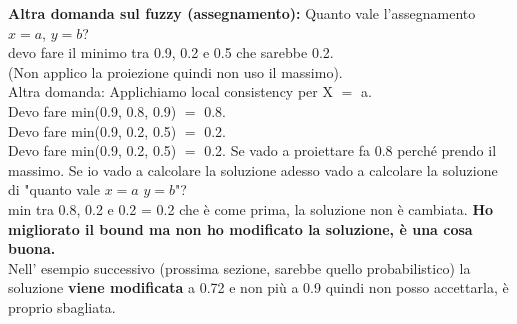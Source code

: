 \textbf{Altra domanda sul fuzzy (assegnamento): } Quanto vale l'assegnamento
$x=a$, $y=b$? \\devo fare il minimo tra 0.9, 0.2 e 0.5 che sarebbe 0.2. \\(Non
applico la proiezione quindi non uso il massimo). \\Altra domanda: Applichiamo
local consistency per X $=$ a. \\Devo fare min(0.9, 0.8, 0.9) $=$ 0.8. \\Devo
fare min(0.9, 0.2, 0.5) $=$ 0.2. \\Devo fare min(0.9, 0.2, 0.5) $=$ 0.2. Se vado
a proiettare fa 0.8 perché prendo il massimo. Se io vado a calcolare la
soluzione adesso vado a calcolare la soluzione di "quanto vale $x=a$ $y=b$"?
\\min tra 0.8, 0.2 e 0.2 = 0.2 che è come prima, la soluzione non è cambiata.
\textbf{Ho migliorato il bound ma non ho modificato la soluzione, è una cosa buona.}
\\Nell' esempio successivo (prossima sezione, sarebbe quello probabilistico) la
soluzione \textbf{viene modificata} a 0.72 e non più a 0.9 quindi non posso
accettarla, è proprio sbagliata.
